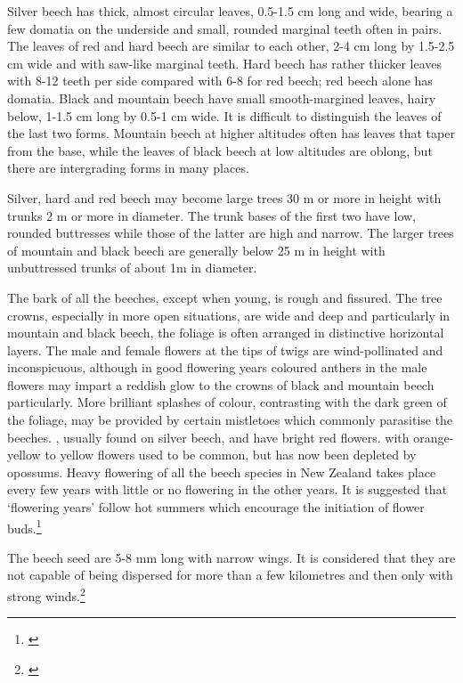 Silver beech has thick, almost circular leaves, 0.5-1.5 cm long and wide, bearing a few domatia on the underside and small, rounded marginal teeth often in pairs.
The leaves of red and hard beech are similar to each other, 2-4 cm long by 1.5-2.5 cm wide and with saw-like marginal teeth.
Hard beech has rather thicker leaves with 8-12 teeth per side compared with 6-8 for red beech; red beech alone has domatia.
Black and mountain beech have small smooth-margined leaves, hairy below, 1-1.5 cm long by 0.5-1 cm wide.
It is difficult to distinguish the leaves of the last two forms.
Mountain beech at higher altitudes often has leaves that taper from the base, while the leaves of black beech at low altitudes are oblong, but there are intergrading forms in many places.

Silver, hard and red beech may become large trees 30 m or more in height with trunks 2 m or more in diameter.
The trunk bases of the first two have low, rounded buttresses while those of the latter are high and narrow.
The larger trees of mountain and black beech are generally below 25 m in height with unbuttressed trunks of about 1m in diameter.

The bark of all the beeches, except when young, is rough and fissured.
The tree crowns, especially in more open situations, are wide and deep and particularly in mountain and black beech, the foliage is often arranged in distinctive horizontal layers.
The male and female flowers at the tips of twigs are wind-pollinated and inconspicuous, although in good flowering years coloured anthers in the male flowers may impart a reddish glow to the crowns of black and mountain beech particularly.
More brilliant splashes of colour, contrasting with the dark green of the foliage, may be provided by certain mistletoes which commonly parasitise the beeches. , usually found on silver beech, and  have bright red flowers.  with orange-yellow to yellow flowers used to be common, but has now been depleted by opossums.
Heavy flowering of all the beech species in New Zealand takes place every few years with little or no flowering in the other years.
It is suggested that `flowering years' follow hot summers which encourage the initiation of flower buds.\footnote{\cite{poole1948flowering}}

The beech seed are 5-8 mm long with narrow wings.
It is considered that they are not capable of being dispersed for more than a few kilometres and then only with strong winds.\footnote{\cite{preest1963dispersal}}

